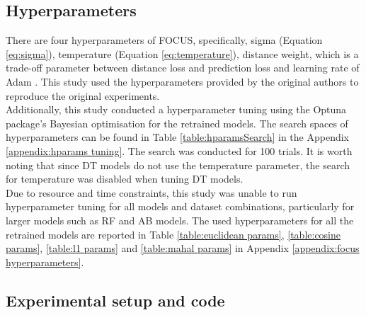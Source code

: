 
\subsection{Hyperparameters}
There are four hyperparameters of FOCUS, specifically, sigma (Equation \ref{eq:sigma}), temperature (Equation \ref{eq:temperature}), distance weight, which is a trade-off parameter between distance loss and prediction loss and learning rate of Adam \cite{kingma2014adam}. This study used the hyperparameters provided by the original authors to reproduce the original experiments.\\
Additionally, this study conducted a hyperparameter tuning using the Optuna package\cite{akiba2019optuna}'s Bayesian optimisation for the retrained models. The search spaces of hyperparameters can be found in Table \ref{table:hparamsSearch} in the Appendix \ref{appendix:hparams tuning}. The search was conducted for 100 trials. It is worth noting that since DT models do not use the temperature parameter, the search for temperature was disabled when tuning DT models.\\
Due to resource and time constraints, this study was unable to run hyperparameter tuning for all models and dataset combinations, particularly for larger models such as RF and AB models. The used hyperparameters for all the retrained models are reported in Table \ref{table:euclidean params}, \ref{table:cosine params}, \ref{table:l1 params} and \ref{table:mahal params} in Appendix \ref{appendix:focus hyperparameters}.


\subsection{Experimental setup and code}
\label{sec:experiments}
